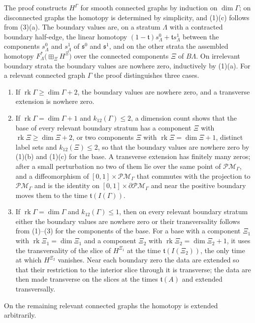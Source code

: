 The proof constructs $H^\Gamma$ for smooth connected graphs by induction on
$\dim\Gamma$; on disconnected graphs the homotopy is determined by
simplicity, and (1)(c) follows from (3)(a).  The boundary values are, on a
stratum $\Lambda$ with a contracted boundary half-edge, the linear homotopy
${(1-\mathfrak t)s^0_\Lambda+\mathfrak ts^1_\Lambda}$ between the components
$s^0_\Lambda$ and $s^1_\Lambda$ of $\mathfrak s^0$ and $\mathfrak s^1$, and on the other strata
the assembled homotopy $F_\Lambda^*\bigl(\boxplus_\Xi H^\Xi\bigr)$ over the
connected components $\Xi$ of $B\Lambda$.  On irrelevant boundary strata the
boundary values are nowhere zero, inductively by (1)(a).  For a relevant
connected graph $\Gamma$ the proof distinguishes three cases.
\begin{enumerate}
\item[(a)] If $\operatorname{rk}\Gamma\geq\dim\Gamma+2$, the boundary values
are nowhere zero, and a transverse extension is nowhere zero.
\item[(b)] If $\operatorname{rk}\Gamma=\dim\Gamma+1$ and
$k_{12}(\Gamma)\leq2$, a dimension count shows that the base of every
relevant boundary stratum has a component $\Xi$ with
$\operatorname{rk}\Xi\geq\dim\Xi+2$, or two components $\Xi$ with
$\operatorname{rk}\Xi=\dim\Xi+1$, distinct label sets and
$k_{12}(\Xi)\leq2$, so that the
boundary values are nowhere zero by (1)(b) and (1)(c) for the base.  A
transverse extension has finitely many zeros; after a small perturbation no
two of them lie over the same point of $\mathcal{PM}_\Gamma$, and a
diffeomorphism of
$[0,1]\times\mathcal{PM}_\Gamma$ that commutes with the projection to
$\mathcal{PM}_\Gamma$ and is the identity on
$[0,1]\times\partial\mathcal{PM}_\Gamma$ and near the positive boundary
moves them to the time $\mathfrak t(I(\Gamma))$.
\item[(c)] If $\operatorname{rk}\Gamma=\dim\Gamma$ and
$k_{12}(\Gamma)\leq1$, then on every relevant boundary stratum either the
boundary values are nowhere zero or their transversality follows from
(1)--(3) for the components of the base.  For a base with a
component $\Xi_1$ with $\operatorname{rk}\Xi_1=\dim\Xi_1$ and a component
$\Xi_2$ with $\operatorname{rk}\Xi_2=\dim\Xi_2+1$, it uses the
transversality of the slice of $H^{\Xi_1}$ at the time
$\mathfrak t(I(\Xi_2))$, the only time at which $H^{\Xi_2}$ vanishes.  Near
each boundary zero the data are extended so that their restriction to the
interior slice through it is transverse; the data are then made transverse
on the slices at the times $\mathfrak t(A)$ and extended transversally.
\end{enumerate}
On the remaining relevant connected graphs the homotopy is extended
arbitrarily.

